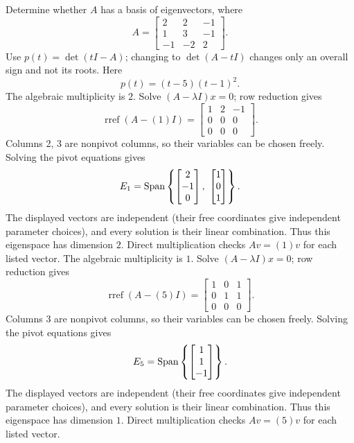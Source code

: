\goal Determine whether $A$ has a basis of eigenvectors, where
\[A=\begin{bmatrix}2&2&-1\\1&3&-1\\-1&-2&2\end{bmatrix}.\]
Use $p(t)=\det(tI-A)$; changing to $\det(A-tI)$ changes only an overall sign and not its roots. Here
\[p(t)=\left(t - 5\right) \left(t - 1\right)^{2}.\]
The algebraic multiplicity is $2$. Solve $(A-\lambda I)x=0$; row reduction gives
\[\operatorname{rref}(A-(1)I)=\begin{bmatrix}1&2&-1\\0&0&0\\0&0&0\end{bmatrix}.\]
Columns 2, 3 are nonpivot columns, so their variables can be chosen freely. Solving the pivot equations gives
\[E_{1}=\Span\left\{\begin{bmatrix}2\\-1\\0\end{bmatrix},\ \begin{bmatrix}1\\0\\1\end{bmatrix}\right\}.\]
The displayed vectors are independent (their free coordinates give independent parameter choices), and every solution is their linear combination. Thus this eigenspace has dimension $2$. Direct multiplication checks $Av=(1)v$ for each listed vector.
The algebraic multiplicity is $1$. Solve $(A-\lambda I)x=0$; row reduction gives
\[\operatorname{rref}(A-(5)I)=\begin{bmatrix}1&0&1\\0&1&1\\0&0&0\end{bmatrix}.\]
Columns 3 are nonpivot columns, so their variables can be chosen freely. Solving the pivot equations gives
\[E_{5}=\operatorname{Span}\left\{\begin{bmatrix}1\\1\\-1\end{bmatrix}\right\}.\]
The displayed vectors are independent (their free coordinates give independent parameter choices), and every solution is their linear combination. Thus this eigenspace has dimension $1$. Direct multiplication checks $Av=(5)v$ for each listed vector.
